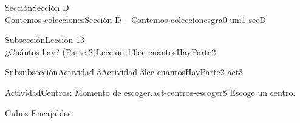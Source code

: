 \begin{sectionptx}{Sección}{{\Large Sección D\\}Contemos colecciones}{}{Sección D -~Contemos colecciones}{}{}{gra0-uni1-secD}
\begin{subsectionptx}{Subsección}{{\normalsize Lección 13\\[-0.05cm]}¿Cuántos hay? (Parte 2)}{}{Lección 13}{}{}{lec-cuantosHayParte2}
%
%
\typeout{************************************************}
\typeout{************************************************}
%
%
%
\typeout{************************************************}
\typeout{************************************************}
%
%
%
\typeout{************************************************}
\typeout{************************************************}
%
\begin{subsubsectionptx}{Subsubsección}{Actividad 3}{}{Actividad 3}{}{}{lec-cuantosHayParte2-act3}
\begin{activity}{Actividad}{Centros: Momento de escoger.}{act-centros-escoger8}%
Escoge un centro.%
\begin{sidebyside}{2}{0.025}{0.025}{0.05}%
\begin{sbspanel}{0.45}%
Cubos Encajables%
\par

\end{sbspanel}
\end{sidebyside}
\end{activity}
\end{subsubsectionptx}
\end{subsectionptx}
\end{sectionptx}
